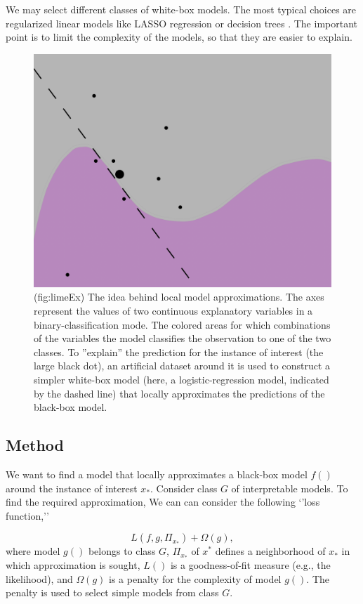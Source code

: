 \documentclass[12pt,]{krantz}
\begin{document}
We may select different classes of white-box models. The most typical choices are regularized linear models like LASSO regression \citep{Tibshirani94regressionshrinkage} or decision trees \citep{party2006}. The important point is to limit the complexity of the models, so that they are easier to explain.

\begin{figure}

{\centering \includegraphics[width=0.7\linewidth]{figure/limeEx} 

}

\caption{(fig:limeEx) The idea behind local model approximations. The axes represent the values of two continuous explanatory variables in a binary-classification mode. The colored areas for which combinations of the variables the model classifies the observation to one of the two classes. To ''explain'' the prediction for the instance of interest (the large black dot), an artificial dataset around it is used to construct a simpler white-box model (here, a logistic-regression model, indicated by the dashed line) that locally approximates the predictions of the black-box model.}\label{fig:limeEx}
\end{figure}

\hypertarget{LIMEMethod}{%
\subsection{Method}\label{LIMEMethod}}

We want to find a model that locally approximates a black-box model \(f()\) around the instance of interest \(x_*\). Consider class \(G\) of interpretable models. To find the required approximation, We can can consider the following `'loss function,''

\[
L(f, g, \Pi_{x_*}) + \Omega (g), 
\]
where model \(g()\) belongs to class \(G\), \(\Pi_{x_*}\) of \(x^*\) defines a neighborhood of \(x_*\) in which approximation is sought, \(L()\) is a goodness-of-fit measure (e.g., the likelihood), and \(\Omega(g)\) is a penalty for the complexity of model \(g()\). The penalty is used to select simple models from class \(G\).
\end{document}
